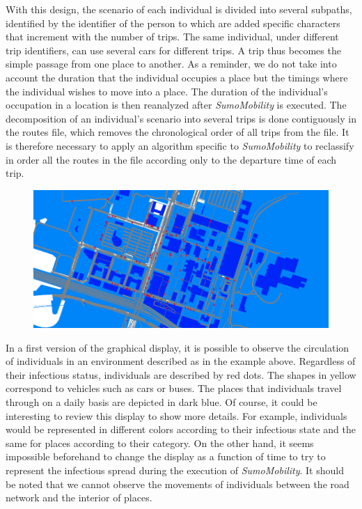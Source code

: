 With this design, the scenario of each individual is divided into several subpaths, identified by the identifier of the person to which are added specific characters that increment with the number of trips. The same individual, under different trip identifiers, can use several cars for different trips. A trip thus becomes the simple passage from one place to another. As a reminder, we do not take into account the duration that the individual occupies a place but the timings where the individual wishes to move into a place. The duration of the individual's occupation in a location is then reanalyzed after \textit{SumoMobility} is executed. The decomposition of an individual's scenario into several trips is done contiguously in the routes file, which removes the chronological order of all trips from the file. It is therefore necessary to apply an algorithm specific to \textit{SumoMobility} to reclassify in order all the routes in the file according only to the departure time of each trip.\\

\begin{figure}[h]
  \centering
  \includegraphics[width=\linewidth]{media/sumo_mobility.png}
  \caption{}
  \label{fig:sumomobility}
\end{figure}

In a first version of the graphical display, it is possible to observe the circulation of individuals in an environment described as in the example above. Regardless of their infectious status, individuals are described by red dots. The shapes in yellow correspond to vehicles such as cars or buses. The places that individuals travel through on a daily basis are depicted in dark blue. Of course, it could be interesting to review this display to show more details. For example, individuals would be represented in different colors according to their infectious state and the same for places according to their category. On the other hand, it seems impossible beforehand to change the display as a function of time to try to represent the infectious spread during the execution of \textit{SumoMobility}. It should be noted that we cannot observe the movements of individuals between the road network and the interior of places.\\

